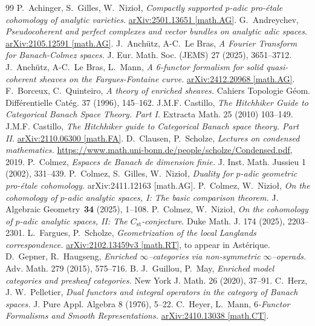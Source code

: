 \documentclass[10pt]{amsart}
\theoremstyle{definition}
\theoremstyle{remark}
\newcommand{\st}{\operatorname{st} }
\numberwithin{equation}{section}
\numberwithin{equation}{section}
\begin{document}
\begin{thebibliography}{99}
  P.~Achinger, S.~Gilles, W.~Nizio\l, {\em Compactly supported $p$-adic pro-\'etale cohomology of analytic varieties.} 	\url{arXiv:2501.13651 [math.AG]}.
 G.~Andreychev, {\em Pseudocoherent and perfect complexes and vector bundles on analytic adic spaces}. \url{arXiv:2105.12591 [math.AG]}.
  J.~Anch\"utz, A-C.~Le Bras, {\em A Fourier Transform for Banach-Colmez spaces.}  	
J. Eur. Math. Soc. (JEMS) 27 (2025), 3651--3712.
 J.~Anch\"utz, A-C.~Le Bras, L.~Mann, {\em  A 6-functor formalism for solid quasi-coherent sheaves on the Fargues-Fontaine curve.}  \url{arXiv:2412.20968 [math.AG]}.
  F.~Borceux, C.~Quinteiro, {\em A theory of enriched sheaves.}  Cahiers Topologie G\'eom. Diff\'erentielle Cat\'eg. 37 (1996), 145--162.
 J.M.F. Castillo, {\em The Hitchhiker Guide to Categorical Banach Space Theory. Part I.} Extracta Math. 25
(2010) 103--149.
 J.M.F. Castillo, {\em The Hitchhiker guide to Categorical Banach space theory. Part II.}  	\url{arXiv:2110.06300 [math.FA]}.
 D.~Clausen, P.~Scholze, {\em Lectures on condensed mathematics.} 
\url{https://www.math.uni-bonn.de/people/scholze/Condensed.pdf}, 2019.
 P.~Colmez, {\em Espaces de Banach de dimension finie.} J. Inst. Math. Jussieu 1 (2002), 331--439.
 P.~Colmez, S.~Gilles, W.~Nizio\l, {\em Duality for $p$-adic geometric pro-\'etale cohomology.}  	arXiv:2411.12163 [math.AG].
 P.~Colmez, W.~Nizio\l, {\em On the cohomology of $p$-adic analytic spaces, I: The basic comparison theorem.}  J. Algebraic Geometry~{\bf 34} (2025), 1--108.
  P.~Colmez, W.~Nizio\l,  {\em On the cohomology of $p$-adic analytic spaces, II: The $C_{\st}$-conjecture}.  
Duke Math. J. 174 (2025), 2203--2301.
 L.~Fargues, P.~Scholze, {\em Geometrization of the local Langlands correspondence.}   
\url{arXiv:2102.13459v3 [math.RT]}, to appear in Ast\'erique.
 D.~Gepner,  R.~Haugseng, {\em Enriched $\infty$--categories via non-symmetric $\infty$--operads.} Adv. Math. 279 (2015), 575--716.
 B. J.~Guillou, P.~May, {\em Enriched model categories and presheaf categories.} New York J. Math. 26 (2020), 37--91.
 C.~Herz, J. W.~Pelletier, {\em Dual functors and integral operators in the category of Banach spaces.}
J. Pure Appl. Algebra 8 (1976), 5--22.
 C.~Heyer, L.~Mann, {\em $6$-Functor Formalisms and Smooth Representations.}  	
\url{arXiv:2410.13038 [math.CT]}.

\end{thebibliography}
\end{document}
